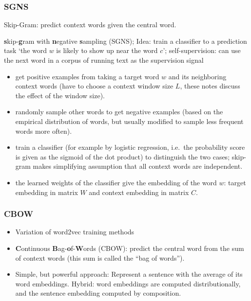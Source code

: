 \documentclass[11pt, a4paper]{amsart}
\begin{document}
\subsubsection{SGNS}

Skip-Gram:
predict context words given the central word.

\textbf{s}kip-\textbf{g}ram with \textbf{n}egative \textbf{s}ampling (SGNS);
Idea: train a classifier to a prediction task `the word $w$ is likely to show up near the word $c$';
self-supervision: can use the next word in a corpus of running text as the supervision signal
\begin{itemize}
	\item get positive examples from taking a target word $w$ and its neighboring context words (have to choose a context window size $L$, these notes \cite{DBLP:journals/corr/Goldberg15c} discuss the effect of the window size).
	\item randomly sample other words to get negative examples (based on the empirical distribution of words, but usually modified to sample less frequent words more often).
	\item train a classifier (for example by logistic regression, i.e.\ the probability score is given as the sigmoid of the dot product) to distinguish the two cases;
	skip-gram makes simplifying assumption that all context words are independent.
	\item the learned weights of the classifier give the embedding of the word $w$:
	target embedding in matrix $W$ and context embedding in matrix $C$.
\end{itemize}


\subsubsection{CBOW}

\begin{itemize}
	\item Variation of word2vec training methods
	\item \textbf{C}ontinuous \textbf{B}ag-\textbf{o}f-\textbf{W}ords (CBOW):
	predict the central word from the sum of context words (this sum is called the ``bag of words'').
	\item Simple, but powerful approach:
	Represent a sentence with the average of its word embeddings.
	Hybrid: word embeddings are computed distributionally, and the sentence embedding computed by composition.
\end{itemize}
\end{document}
